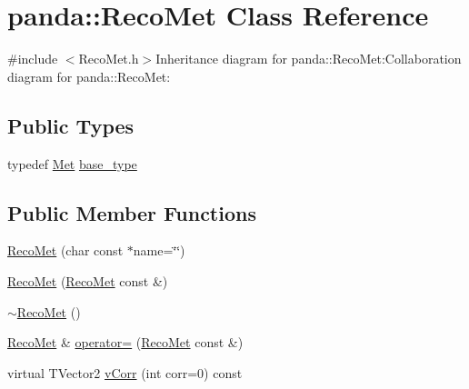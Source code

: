 \hypertarget{classpanda_1_1RecoMet}{
\section{panda::RecoMet Class Reference}
\label{classpanda_1_1RecoMet}
}


{\ttfamily \#include $<$RecoMet.h$>$}Inheritance diagram for panda::RecoMet:Collaboration diagram for panda::RecoMet:\subsection*{Public Types}
\begin{DoxyCompactItemize}
\item 
typedef \hyperlink{classpanda_1_1Met}{Met} \hyperlink{classpanda_1_1RecoMet_a08f27abd8ffe21cbfa4b44ce77a19bf3}{base\_\-type}
\end{DoxyCompactItemize}
\subsection*{Public Member Functions}
\begin{DoxyCompactItemize}
\item 
\hyperlink{classpanda_1_1RecoMet_a3d2d9417bc9084a621417810b2fc03d7}{RecoMet} (char const $\ast$name=\char`\"{}\char`\"{})
\item 
\hyperlink{classpanda_1_1RecoMet_a23c0b8b3f990ec24f726d0522c959043}{RecoMet} (\hyperlink{classpanda_1_1RecoMet}{RecoMet} const \&)
\item 
\hyperlink{classpanda_1_1RecoMet_a5984b85ef78150f50822cb4e4201893e}{$\sim$RecoMet} ()
\item 
\hyperlink{classpanda_1_1RecoMet}{RecoMet} \& \hyperlink{classpanda_1_1RecoMet_a9457a28604d28d4f06346a121874dc27}{operator=} (\hyperlink{classpanda_1_1RecoMet}{RecoMet} const \&)
\item 
virtual TVector2 \hyperlink{classpanda_1_1RecoMet_a9fedbcdca412dc52c25330f1e3900da1}{vCorr} (int corr=0) const 
\end{DoxyCompactItemize}
